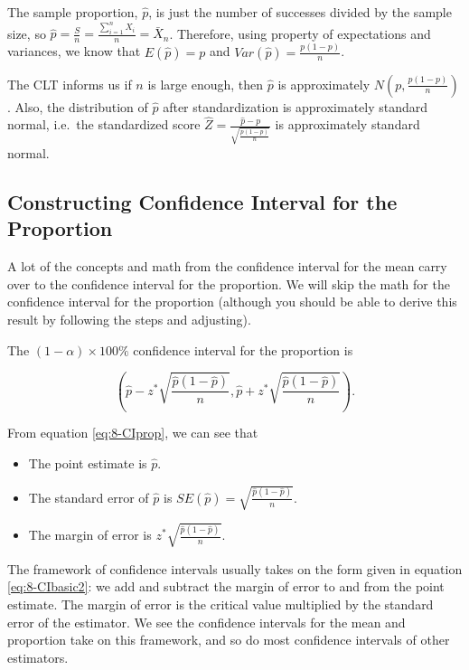 \documentclass[
]{book}
\providecommand{\tightlist}{%
  \setlength{\itemsep}{0pt}\setlength{\parskip}{0pt}}
\begin{document}
The sample proportion, \(\hat{p}\), is just the number of successes divided by the sample size, so \(\hat{p} = \frac{S}{n} = \frac{\sum_{i=1}^n X_i}{n} = \bar{X}_n\). Therefore, using property of expectations and variances, we know that \(E(\hat{p}) = p\) and \(Var(\hat{p}) = \frac{p(1-p)}{n}\).

The CLT informs us if \(n\) is large enough, then \(\hat{p}\) is approximately \(N\left(p, \frac{p(1-p)}{n}\right)\). Also, the distribution of \(\hat{p}\) after standardization is approximately standard normal, i.e.~the standardized score \(\hat{Z} = \frac{\hat{p}-p}{\sqrt{\frac{p(1-p)}{n}}}\) is approximately standard normal.

\subsection{Constructing Confidence Interval for the Proportion}\label{constructing-confidence-interval-for-the-proportion}

A lot of the concepts and math from the confidence interval for the mean carry over to the confidence interval for the proportion. We will skip the math for the confidence interval for the proportion (although you should be able to derive this result by following the steps and adjusting).

The \((1-\alpha) \times 100\%\) confidence interval for the proportion is

\begin{equation} 
\left( \hat{p} - z^{*} \sqrt{\frac{\hat{p}(1-\hat{p})}{n}}, \hat{p} + z^{*} \sqrt{\frac{\hat{p}(1-\hat{p})}{n}} \right).
\label{eq:8-CIprop}
\end{equation}

From equation \eqref{eq:8-CIprop}, we can see that

\begin{itemize}
\tightlist
\item
  The point estimate is \(\hat{p}\).
\item
  The standard error of \(\hat{p}\) is \(SE(\hat{p}) = \sqrt{\frac{\hat{p}(1-\hat{p})}{n}}\).
\item
  The margin of error is \(z^{*} \sqrt{\frac{\hat{p}(1-\hat{p})}{n}}\).
\end{itemize}

The framework of confidence intervals usually takes on the form given in equation \eqref{eq:8-CIbasic2}: we add and subtract the margin of error to and from the point estimate. The margin of error is the critical value multiplied by the standard error of the estimator. We see the confidence intervals for the mean and proportion take on this framework, and so do most confidence intervals of other estimators.
\end{document}
